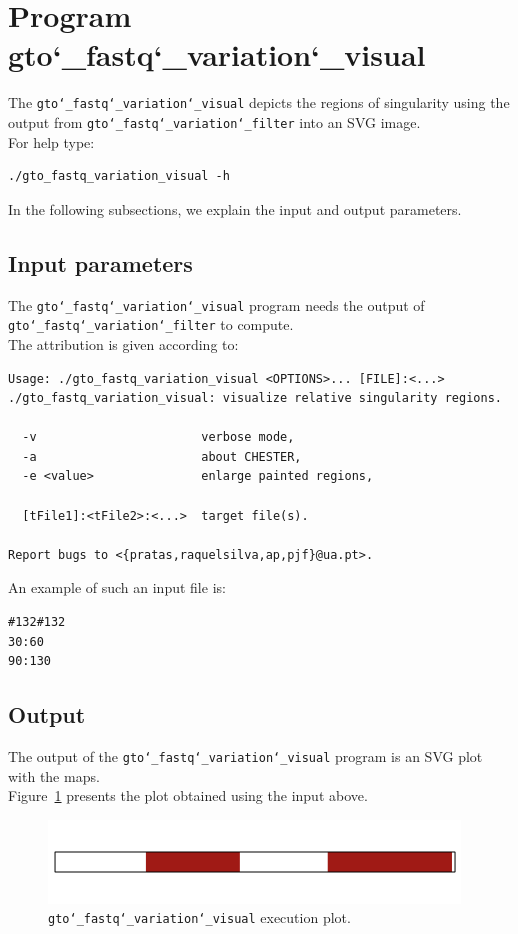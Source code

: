 \section{Program gto\char`_fastq\char`_variation\char`_visual}

The \texttt{gto\char`_fastq\char`_variation\char`_visual} depicts the regions of singularity using the output from \texttt{gto\char`_fastq\char`_variation\char`_filter} into an SVG image.\\

For help type:
\begin{lstlisting}
./gto_fastq_variation_visual -h
\end{lstlisting}
In the following subsections, we explain the input and output parameters.

\subsection*{Input parameters}

The \texttt{gto\char`_fastq\char`_variation\char`_visual} program needs the output of \texttt{gto\char`_fastq\char`_variation\char`_filter} to compute.\\

The attribution is given according to:
\begin{lstlisting}
Usage: ./gto_fastq_variation_visual <OPTIONS>... [FILE]:<...>
./gto_fastq_variation_visual: visualize relative singularity regions.
                                                     
  -v                       verbose mode,             
  -a                       about CHESTER,            
  -e <value>               enlarge painted regions,  
                                                     
  [tFile1]:<tFile2>:<...>  target file(s).           
                                                     
Report bugs to <{pratas,raquelsilva,ap,pjf}@ua.pt>. 
\end{lstlisting}
An example of such an input file is:
\begin{lstlisting}
#132#132
30:60
90:130
\end{lstlisting}

\subsection*{Output}

The output of the \texttt{gto\char`_fastq\char`_variation\char`_visual} program is an SVG plot with the maps.\\
Figure~\ref{fig:gtoFastqVariationVisual} presents the plot obtained using the input above.

\begin{figure}[!h]
\centering
\includegraphics[scale=0.6]{./images/gto_fastq_variation_visual.png}
\caption{\texttt{gto\char`_fastq\char`_variation\char`_visual} execution plot.}
\label{fig:gtoFastqVariationVisual}
\end{figure}